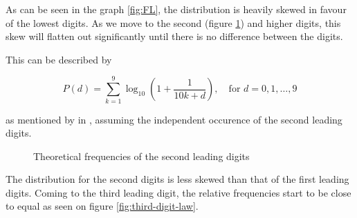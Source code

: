 As can be seen in the graph \ref{fig:FL}, the distribution is heavily skewed in favour of the lowest digits. As we move to the second (figure \ref{fig:second-digit-law}) and higher digits, this skew will flatten out significantly until there is no difference between the digits.  \cite{kossovsky2014benford}

This can be described by 

\begin{equation}
    \label{BZ-general_second}
    P(d) = \sum\limits_{k=1}^{9} \log_{10}\left( 1+\frac{1}{10k+d}\right), \quad \text{for } d = 0,1,\dots,9
\end{equation}

as mentioned by \citeauthor{Hronova2023} in \citeyear{Hronova2023}, assuming the independent occurence of the second leading digits. 

\begin{figure}[h]
    \centering
    \caption{Theoretical frequencies of the second leading digits}  
    \label{fig:second-digit-law}
        \pgfplotsset{width=8.5cm,compat=1.18}
\end{figure}

The distribution for the second digits is less skewed than that of the first leading digits. 
Coming to the third leading digit, the relative frequencies start to be close to equal as seen on figure \ref{fig:third-digit-law}. \cite{kossovsky2014benford}

